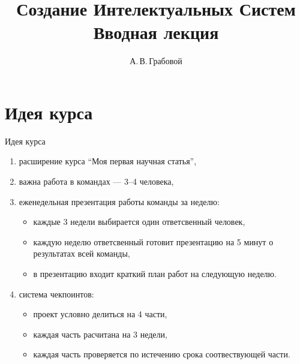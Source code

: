 \documentclass[10pt,pdf,hyperref={unicode}]{beamer}
\title[Вводная лекция]{Создание Интелектуальных Систем \\ Вводная лекция}
\author{А.\,В.\,Грабовой}
\institute[]{Московский физико-технический институт}
\begin{document}
\begin{frame}
\titlepage
\end{frame}

\section{Идея курса}
\begin{frame}{Идея курса}
\bigskip
\begin{enumerate}[1)]
\justifying
\item расширение курса ``Моя первая научная статья'',
\item важна работа в командах --- 3--4 человека,
\item еженедельная презентация работы команды за неделю:
    \begin{itemize}
    \justifying
        \item каждые 3 недели выбирается один ответсвенный человек,
        \item каждую неделю ответсвенный готовит презентацию на 5 минут о результатах всей команды,
        \item в презентацию входит краткий план работ на следующую неделю.
    \end{itemize}
\item система чекпоинтов:
    \begin{itemize}
    \justifying
        \item проект условно делиться на 4 части,
        \item каждая часть расчитана на 3 недели,
        \item каждая часть проверяется по истечению срока соотвествующей части.
    \end{itemize}
\end{enumerate}

\end{frame}

\end{document}
